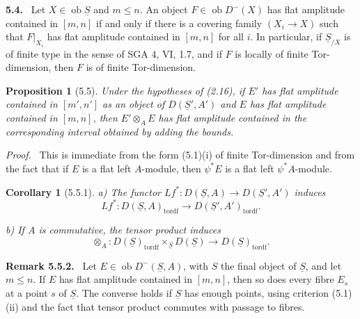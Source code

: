 \documentclass[13pt]{extarticle}
\newcommand{\uS}{\underline S}
\newcommand{\ob}{\operatorname{ob}}
\newenvironment{statement}[1]{\par\medskip\noindent\textbf{#1.}\ }{\par\medskip}
\newenvironment{prooftext}[1][Proof]{\par\noindent\emph{#1.}\ }{\par\medskip}
\newenvironment{remarktext}[1][Remark]{\par\noindent\textbf{#1.}\ }{\par\medskip}
\newtheorem*{proposition*}{Proposition}
\newtheorem*{corollary*}{Corollary}
\begin{document}
\begin{statement}{5.4}
Let $X\in\ob\uS$ and $m\leq n$. An object $F\in\ob D^-(X)$ has flat amplitude contained in $[m,n]$ if and only if there is a covering family $(X_i\to X)$ such that $F|_{X_i}$ has flat amplitude contained in $[m,n]$ for all $i$. In particular, if $\uS_{/X}$ is of finite type in the sense of SGA 4, VI, 1.7, and if $F$ is locally of finite Tor-dimension, then $F$ is of finite Tor-dimension.
\end{statement}

\begin{proposition*}[5.5]
Under the hypotheses of (2.16), if $E'$ has flat amplitude contained in $[m',n']$ as an object of $D(\uS',A')$ and $E$ has flat amplitude contained in $[m,n]$, then $E'\otimes_AE$ has flat amplitude contained in the corresponding interval obtained by adding the bounds.
\end{proposition*}

\begin{prooftext}
This is immediate from the form (5.1)(i) of finite Tor-dimension and from the fact that if $E$ is a flat left $A$-module, then $\psi^*E$ is a flat left $\psi^*A$-module.
\end{prooftext}

\begin{corollary*}[5.5.1]
\textup{a)} The functor $Lf^*:D(\uS,A)\to D(\uS',A')$ induces
\[
Lf^*:D(\uS,A)_{\mathrm{tordf}}
\longrightarrow D(\uS',A')_{\mathrm{tordf}}.
\]

\textup{b)} If $A$ is commutative, the tensor product induces
\[
\otimes_A:D(\uS)_{\mathrm{tordf}}\times_{\uS}D(\uS)
\longrightarrow D(\uS)_{\mathrm{tordf}}.
\]
\end{corollary*}

\begin{remarktext}[Remark 5.5.2]
Let $E\in\ob D^-(\uS,A)$, with $S$ the final object of $\uS$, and let $m\leq n$. If $E$ has flat amplitude contained in $[m,n]$, then so does every fibre $E_s$ at a point $s$ of $\uS$. The converse holds if $\uS$ has enough points, using criterion (5.1)(ii) and the fact that tensor product commutes with passage to fibres.
\end{remarktext}
\end{document}
